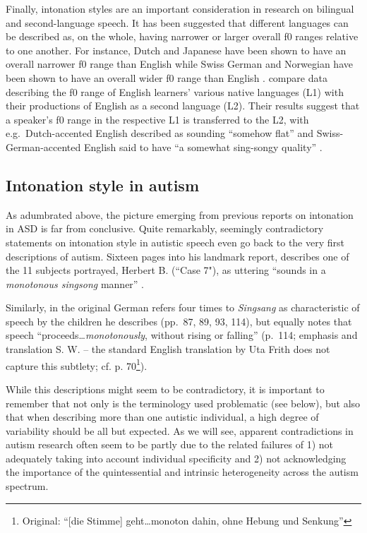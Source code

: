 Finally, intonation styles are an important consideration in research on bilingual and second-language speech.
It has been suggested that different languages can be described as, on the whole, having narrower or larger overall f0 ranges relative to one another. For instance, Dutch and Japanese have been shown to have an overall narrower f0 range than English while Swiss German and Norwegian have been shown to have an overall wider f0 range than English \citep{celce-murciaTeachingPronunciationReference1996,grahamFundamentalFrequencyRange2014}. \citet{celce-murciaTeachingPronunciationReference1996} compare data describing the f0 range of English learners' various native languages (L1) with their productions of English as a second language (L2). Their results suggest that a speaker's f0 range in the respective L1 is transferred to the L2, with e.g.~Dutch-accented English described as sounding ``somehow flat'' and Swiss-German-accented English said to have ``a somewhat sing-songy quality'' \citep[p. 193]{celce-murciaTeachingPronunciationReference1996}.

	\subsection{Intonation style in autism}\label{int_back_ASD}

 As adumbrated above, the picture emerging from previous reports on intonation in ASD is far from conclusive. Quite remarkably, seemingly contradictory statements on intonation style in autistic speech even go back to the very first descriptions of autism. Sixteen pages into his landmark report, \citet{kannerAutisticDisturbancesAffective1943} describes one of the 11 subjects portrayed, Herbert B. (``Case 7"), as uttering ``sounds in a \emph{monotonous singsong} manner'' \citep[p. 232; emphasis S. W.]{kannerAutisticDisturbancesAffective1943}.

 Similarly, \citet{aspergerAutistischenPsychopathenIm1944a} in the original German refers four times to \emph{Singsang} as characteristic of speech by the children he describes (pp.~87, 89, 93, 114), but equally notes that speech ``proceeds\ldots{}\emph{monotonously}, without rising or falling'' (p.~114; emphasis and translation S. W. -- the standard English translation by Uta Frith does not capture this subtlety; cf. \citet{aspergerAutisticPsychopathyChildhood1991} p. 70\footnote{Original: ``{{[}die Stimme{]} geht\ldots monoton dahin, ohne Hebung und Senkung}''}).

While this descriptions might seem to be contradictory, it is important to remember that not only is the terminology used problematic (see below), but also that when describing more than one autistic individual, a high degree of variability should be all but expected. As we will see, apparent contradictions in autism research often seem to be partly due to the related failures of 1) not adequately taking into account individual specificity and 2) not acknowledging the importance of the quintessential and intrinsic heterogeneity across the autism spectrum.

